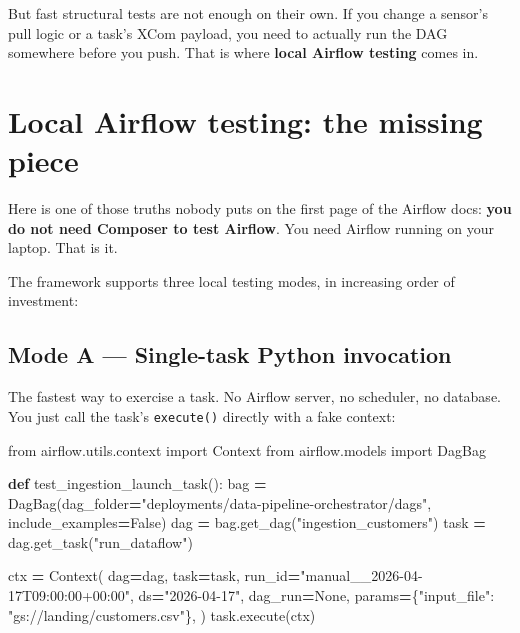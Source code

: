 \documentclass[
  11pt,
  british,
  oneside]{book}
\newenvironment{Shaded}{\begin{snugshade}}{\end{snugshade}}
\newcommand{\ImportTok}[1]{#1}
\newcommand{\KeywordTok}[1]{\textcolor[rgb]{0.13,0.29,0.53}{\textbf{#1}}}
\newcommand{\NormalTok}[1]{#1}
\newcommand{\OperatorTok}[1]{\textcolor[rgb]{0.81,0.36,0.00}{\textbf{#1}}}
\newcommand{\StringTok}[1]{\textcolor[rgb]{0.31,0.60,0.02}{#1}}
\newcommand{\VariableTok}[1]{\textcolor[rgb]{0.00,0.00,0.00}{#1}}
\begin{document}
But fast structural tests are not enough on their own. If you change a
sensor's pull logic or a task's XCom payload, you need to actually run
the DAG somewhere before you push. That is where \textbf{local Airflow
testing} comes in.

\hypertarget{local-airflow-testing-the-missing-piece}{%
\section{Local Airflow testing: the missing
piece}\label{local-airflow-testing-the-missing-piece}}

Here is one of those truths nobody puts on the first page of the Airflow
docs: \textbf{you do not need Composer to test Airflow}. You need
Airflow running on your laptop. That is it.

The framework supports three local testing modes, in increasing order of
investment:

\hypertarget{mode-a-single-task-python-invocation}{%
\subsection{Mode A --- Single-task Python
invocation}\label{mode-a-single-task-python-invocation}}

The fastest way to exercise a task. No Airflow server, no scheduler, no
database. You just call the task's \texttt{execute()} directly with a
fake context:

\begin{Shaded}
\begin{Highlighting}[]
\ImportTok{from}\NormalTok{ airflow.utils.context }\ImportTok{import}\NormalTok{ Context}
\ImportTok{from}\NormalTok{ airflow.models }\ImportTok{import}\NormalTok{ DagBag}

\KeywordTok{def}\NormalTok{ test\_ingestion\_launch\_task():}
\NormalTok{    bag }\OperatorTok{=}\NormalTok{ DagBag(dag\_folder}\OperatorTok{=}\StringTok{"deployments/data{-}pipeline{-}orchestrator/dags"}\NormalTok{,}
\NormalTok{                 include\_examples}\OperatorTok{=}\VariableTok{False}\NormalTok{)}
\NormalTok{    dag }\OperatorTok{=}\NormalTok{ bag.get\_dag(}\StringTok{"ingestion\_customers"}\NormalTok{)}
\NormalTok{    task }\OperatorTok{=}\NormalTok{ dag.get\_task(}\StringTok{"run\_dataflow"}\NormalTok{)}

\NormalTok{    ctx }\OperatorTok{=}\NormalTok{ Context(}
\NormalTok{        dag}\OperatorTok{=}\NormalTok{dag, task}\OperatorTok{=}\NormalTok{task,}
\NormalTok{        run\_id}\OperatorTok{=}\StringTok{"manual\_\_2026{-}04{-}17T09:00:00+00:00"}\NormalTok{,}
\NormalTok{        ds}\OperatorTok{=}\StringTok{"2026{-}04{-}17"}\NormalTok{,}
\NormalTok{        dag\_run}\OperatorTok{=}\VariableTok{None}\NormalTok{,}
\NormalTok{        params}\OperatorTok{=}\NormalTok{\{}\StringTok{"input\_file"}\NormalTok{: }\StringTok{"gs://landing/customers.csv"}\NormalTok{\},}
\NormalTok{    )}
\NormalTok{    task.execute(ctx)}
\end{Highlighting}
\end{Shaded}
\end{document}
